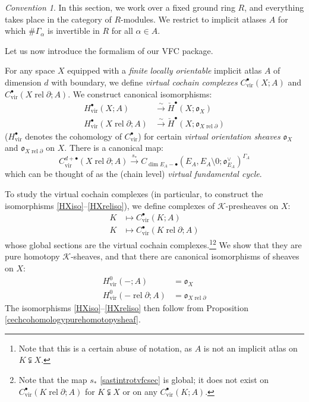 \documentclass[12pt]{article}
\theoremstyle{definition}
\theoremstyle{remark}
\newtheorem{convention}[theorem]{Convention}
\numberwithin{equation}{subsection}
\newcommand{\K}{\mathcal K}
\newcommand{\oo}{\mathfrak o}
\newcommand{\cH}{\check H}
\newcommand{\vir}{\mathrm{vir}}
\newcommand{\rel}{\operatorname{rel}}
\begin{document}
\begin{convention}
In this section, we work over a fixed ground ring $R$, and everything takes place in the category of $R$-modules.  We restrict to implicit atlases $A$ for which $\#\Gamma_\alpha$ is invertible in $R$ for all $\alpha\in A$.
\end{convention}

Let us now introduce the formalism of our VFC package.

For any space $X$ equipped with a \emph{finite} \emph{locally orientable} implicit atlas $A$ of dimension $d$ with boundary, we define \emph{virtual cochain complexes} $C^\bullet_\vir(X;A)$ and $C^\bullet_\vir(X\rel\partial;A)$.  We construct canonical isomorphisms:
\begin{align}
\label{HXiso}H^\bullet_\vir(X;A)&\xrightarrow\sim\cH^\bullet(X;\oo_X)\\
\label{HXreliso}H^\bullet_\vir(X\rel\partial;A)&\xrightarrow\sim\cH^\bullet(X;\oo_{X\rel\partial})
\end{align}
($H^\bullet_\vir$ denotes the cohomology of $C^\bullet_\vir$) for certain \emph{virtual orientation sheaves} $\oo_X$ and $\oo_{X\rel\partial}$ on $X$.  There is a canonical map:
\begin{equation}\label{sastintrotvfcsec}
C^{d+\bullet}_\vir(X\rel\partial;A)\xrightarrow{s_\ast}C_{\dim E_A-\bullet}(E_A,E_A\setminus 0;\oo_{E_A}^\vee)^{\Gamma_A}
\end{equation}
which can be thought of as the (chain level) \emph{virtual fundamental cycle}.

To study the virtual cochain complexes (in particular, to construct the isomorphisms \eqref{HXiso}--\eqref{HXreliso}), we define complexes of $\K$-presheaves on $X$:
\begin{align}
K&\mapsto C^\bullet_\vir(K;A)\\
K&\mapsto C^\bullet_\vir(K\rel\partial;A)
\end{align}
whose global sections are the virtual cochain complexes.\footnote{Note that this is a certain abuse of notation, as $A$ is not an implicit atlas on $K\subsetneqq X$.}\footnote{Note that the map $s_\ast$ \eqref{sastintrotvfcsec} is global; it does not exist on $C^\bullet_\vir(K\rel\partial;A)$ for $K\subsetneqq X$ or on any $C^\bullet_\vir(K;A)$.}  We show that they are pure homotopy $\K$-sheaves, and that there are canonical isomorphisms of sheaves on $X$:
\begin{align}
H^0_\vir(-;A)&=\oo_X\\
H^0_\vir(-\rel\partial;A)&=\oo_{X\rel\partial}
\end{align}
The isomorphisms \eqref{HXiso}--\eqref{HXreliso} then follow from Proposition \ref{cechcohomologypurehomotopysheaf}.
\end{document}
